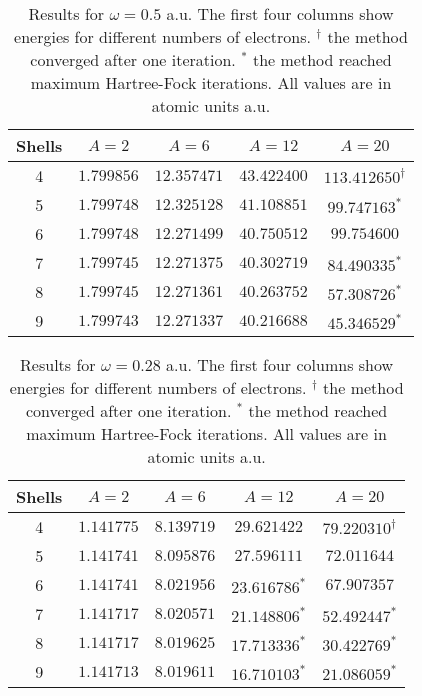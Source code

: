\documentclass[11pt]{article}
\begin{document}
\begin{table}[H]
	\centering
	\caption{Results for $\omega = 0.5$ a.u. The first four columns show energies for different numbers of electrons. $^\dagger$ the method converged after one iteration. $^*$ the method reached maximum Hartree-Fock iterations. All values are in atomic units a.u.}
	\begin{tabular}{c c c c c}
		\\ \hline \hline
		Shells 	& $A = 2$	& $A = 6$ 	& $A = 12$ 	& $A = 20$ 	\\ \hline
         4 & $  1.799856$ & $ 12.357471$ & $ 43.422400$ & $113.412650^\dagger$  \\ 
         5 & $  1.799748$ & $ 12.325128$ & $ 41.108851$ & $ 99.747163^*$  \\ 
         6 & $  1.799748$ & $ 12.271499$ & $ 40.750512$ & $ 99.754600$  \\ 
         7 & $  1.799745$ & $ 12.271375$ & $ 40.302719$ & $ 84.490335^*$  \\ 
         8 & $  1.799745$ & $ 12.271361$ & $ 40.263752$ & $ 57.308726^*$  \\ 
         9 & $  1.799743$ & $ 12.271337$ & $ 40.216688$ & $ 45.346529^*$  \\ 
        \hline \hline
	\end{tabular}
	\label{tab:omega05}
\end{table}

\begin{table}[H]
	\centering
	\caption{Results for $\omega = 0.28$ a.u. The first four columns show energies for different numbers of electrons. $^\dagger$ the method converged after one iteration. $^*$ the method reached maximum Hartree-Fock iterations. All values are in atomic units a.u.}
	\begin{tabular}{c c c c c}
		\\ \hline \hline
		Shells 	& $A = 2$	& $A = 6$ 	& $A = 12$ 	& $A = 20$ 	\\ \hline
         4 & $  1.141775$ & $  8.139719$ & $ 29.621422$ &   $ 79.220310^\dagger$  \\ 
         5 & $  1.141741$ & $  8.095876$ & $ 27.596111$ &   $ 72.011644$  \\ 
         6 & $  1.141741$ & $  8.021956$ & $ 23.616786^*$ & $ 67.907357$  \\ 
         7 & $  1.141717$ & $  8.020571$ & $ 21.148806^*$ & $ 52.492447^*$  \\ 
         8 & $  1.141717$ & $  8.019625$ & $ 17.713336^*$ & $ 30.422769^*$  \\ 
         9 & $  1.141713$ & $  8.019611$ & $ 16.710103^*$ & $ 21.086059^*$  \\ 
        \hline \hline
	\end{tabular}
	\label{tab:omega028}
\end{table}
\end{document}
